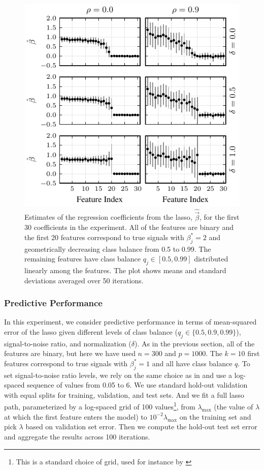 \begin{figure}[htpb]
  \centering
  \includegraphics[]{plots/binary_decreasing_small.pdf}
  \caption{%
    Estimates of the regression coefficients from the lasso, \(\hat{\vec{\beta}}\), for the
    first 30 coefficients in the experiment. All of the features are binary and the first 20
    features correspond to true signals with \(\beta_j^* = 2\) and geometrically decreasing
    class balance from 0.5 to 0.99. The remaining features have class balance \(q_j \in [0.5,
      0.99]\) distributed linearly among the features. The plot shows means and standard
    deviations averaged over 50 iterations.} \label{fig:binary-decreasing}
\end{figure}

\subsubsection{Predictive Performance}\label{sec:predictive-performance}

In this experiment, we consider predictive performance in terms of mean-squared error of
the lasso given different levels of class balance (\(q_j \in \{0.5, 0.9, 0.99\}\)),
signal-to-noise ratio, and normalization (\(\delta\)). As in the previous section, all of
the features are binary, but here we have used \(n=300\) and \(p = \num{1000}\). The
\(k=10\) first features correspond to true signals with \(\beta^*_j = 1\) and all have
class balance \(q\). To set signal-to-noise ratio levels, we rely on the same choice as in
\citet{hastie2020} and use a log-spaced sequence of values from 0.05 to 6. We use standard
hold-out validation with equal splits for training, validation, and test sets. And we fit a
full lasso path, parameterized by a log-spaced grid of 100 values\footnote{This is a
  standard choice of grid, used for instance by \citet{friedman2010}}, from
\(\lambda_\text{max}\) (the value of \(\lambda\) at which the first feature enters the
model) to \(10^{-2}\lambda_\text{max}\) on the training set and pick \(\lambda\) based on
validation set error. Then we compute the hold-out test set error and aggregate the results
across 100 iterations.

